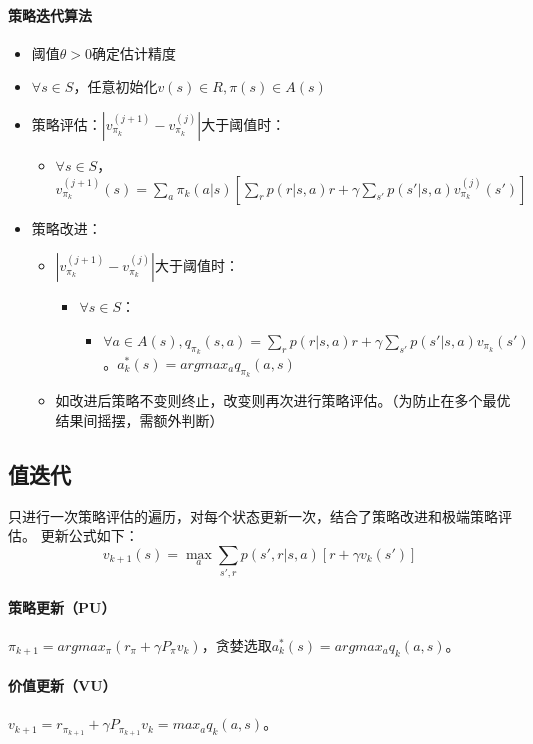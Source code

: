\documentclass[
12pt, %
a4paper, 
oneside, %
headinclude,footinclude, %
]{scrartcl}
\begin{document}
\paragraph{策略迭代算法}
\begin{itemize}
\item 阈值$ \theta > 0 $确定估计精度
\item $ \forall s \in S $，任意初始化$ v(s) \in R, \pi(s)\in A(s) $
\item 策略评估：$ |v_{\pi_k}^{(j + 1)} - v_{\pi_k}^{(j)}| $大于阈值时：
\begin{itemize}
\item $ \forall s \in S $，$ v_{\pi_k}^{(j + 1)}(s) = \sum_a \pi_k(a|s)[\sum_r p(r|s, a)r + \gamma \sum_{s'}p(s'|s ,a)v_{\pi_k}^{(j)}(s')] $
\end{itemize}
\item 策略改进：
\begin{itemize}
\item  $ |v_{\pi_k}^{(j + 1)} - v_{\pi_k}^{(j)}| $大于阈值时：
\begin{itemize}
\item $ \forall s \in S $：
\begin{itemize}
\item $ \forall a \in A(s), q_{\pi_k}(s, a) = \sum_r p(r|s, a)r + \gamma \sum_{s'} p(s'|s, a)v_{\pi_k}(s') $。$ a^*_k(s) = argmax_a q_{\pi_k}(a, s) $
\end{itemize}
\end{itemize}
\item 如改进后策略不变则终止，改变则再次进行策略评估。（为防止在多个最优结果间摇摆，需额外判断）
\end{itemize}
\end{itemize}
\subsection{值迭代}
只进行一次策略评估的遍历，对每个状态更新一次，结合了策略改进和极端策略评估。
更新公式如下：
$$
v_{k + 1}(s) = \max_a \sum_{s', r} p(s', r|s, a)[r + \gamma v_k(s')]
$$
\paragraph{策略更新（PU）}
$ \pi_{k + 1} = argmax_{\pi}(r_{\pi} + \gamma P_{\pi}v_k) $，贪婪选取$ a^*_k(s) = argmax_a q_k(a, s) $。
\paragraph{价值更新（VU）}
$ v_{k + 1} = r_{\pi_{k + 1}} + \gamma P_{\pi_{k + 1}}v_k = max_a q_k(a, s) $。
\end{document}
